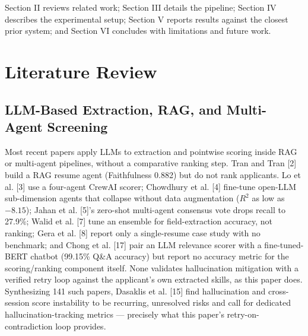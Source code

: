 \documentclass[journal]{IEEEtran}
\begin{document}
Section II reviews related work; Section III details the pipeline; Section IV describes the experimental setup; Section V reports results against the closest prior system; and Section VI concludes with limitations and future work.

\section{Literature Review}

\subsection{LLM-Based Extraction, RAG, and Multi-Agent Screening}
Most recent papers apply LLMs to extraction and pointwise scoring inside RAG or multi-agent pipelines, without a comparative ranking step. Tran and Tran [2] build a RAG resume agent (Faithfulness 0.882) but do not rank applicants. Lo et al. [3] use a four-agent CrewAI scorer; Chowdhury et al. [4] fine-tune open-LLM sub-dimension agents that collapse without data augmentation ($R^2$ as low as $-8.15$); Jahan et al. [5]'s zero-shot multi-agent consensus vote drops recall to 27.9\%; Walid et al. [7] tune an ensemble for field-extraction accuracy, not ranking; Gera et al. [8] report only a single-resume case study with no benchmark; and Chong et al. [17] pair an LLM relevance scorer with a fine-tuned-BERT chatbot (99.15\% Q\&A accuracy) but report no accuracy metric for the scoring/ranking component itself. None validates hallucination mitigation with a verified retry loop against the applicant's own extracted skills, as this paper does. Synthesizing 141 such papers, Dasaklis et al. [15] find hallucination and cross-session score instability to be recurring, unresolved risks and call for dedicated hallucination-tracking metrics --- precisely what this paper's retry-on-contradiction loop provides.
\end{document}
